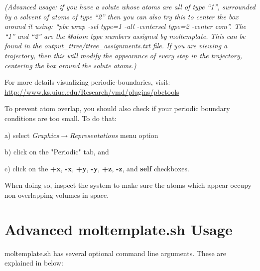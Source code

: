 \documentclass[11pt]{article}
\begin{document}
\textit{(Advanced usage: if you have a solute whose atoms are all 
of type ``1'', surrounded by a solvent of atoms of type ``2''
then you can also try this to center the box around it using: 
``pbc wrap -sel type=1 -all -centersel type=2 -center com''.
The ``1'' and ``2'' are the @atom type numbers assigned by moltemplate.
This can be found in the output\_ttree/ttree\_assignments.txt file.
If you are viewing a trajectory, then this will modify the appearance
of every step in the trajectory, centering the box around the solute atoms.)}

For more details visualizing periodic-boundaries, visit:
\url{http://www.ks.uiuc.edu/Research/vmd/plugins/pbctools}

To prevent atom overlap, you should also check if your periodic boundary 
conditions are too small.  
To do that:
\begin{list}{}
\item a) select \mbox{\textit{Graphics}$\rightarrow$\textit{Representations}}
menu option
\item b) click on the "Periodic" tab, and 
\item c) click on the 
         \textbf{+x}, \textbf{-x}, 
         \textbf{+y}, \textbf{-y}, 
         \textbf{+z}, \textbf{-z},
         and \textbf{self} checkboxes.
\end{list}

When doing so, inspect the system to make sure the atoms which appear 
occupy non-overlapping volumes in space.



\section{Advanced moltemplate.sh Usage}
\label{sec:ttree_man_page}


moltemplate.sh has several optional command line arguments.
These are explained in below:
\end{document}
